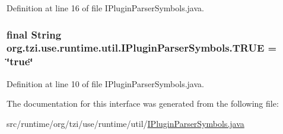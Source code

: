 Definition at line 16 of file I\-Plugin\-Parser\-Symbols.\-java.

\hypertarget{interfaceorg_1_1tzi_1_1use_1_1runtime_1_1util_1_1_i_plugin_parser_symbols_a42e76874b54a7baeeb618aad459e4c59}{
\subsubsection[{T\-R\-U\-E}]{\setlength{\rightskip}{0pt plus 5cm}final String org.\-tzi.\-use.\-runtime.\-util.\-I\-Plugin\-Parser\-Symbols.\-T\-R\-U\-E = \char`\"{}true\char`\"{}\hspace{0.3cm}{\ttfamily [static]}}}\label{interfaceorg_1_1tzi_1_1use_1_1runtime_1_1util_1_1_i_plugin_parser_symbols_a42e76874b54a7baeeb618aad459e4c59}


Definition at line 10 of file I\-Plugin\-Parser\-Symbols.\-java.



The documentation for this interface was generated from the following file\-:\begin{DoxyCompactItemize}
\item 
src/runtime/org/tzi/use/runtime/util/\hyperlink{_i_plugin_parser_symbols_8java}{I\-Plugin\-Parser\-Symbols.\-java}\end{DoxyCompactItemize}
